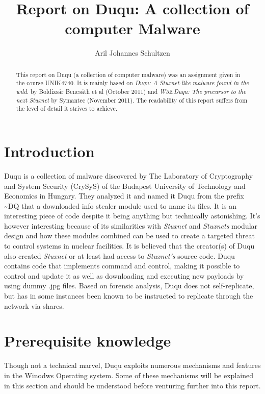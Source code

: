 \documentclass[11pt,english,a4paper]{report}
\title{Report on Duqu: A collection of computer Malware}
\author{Aril Johannes Schultzen}
\begin{document}
\maketitle
\thispagestyle{empty}
\setcounter{page}{0}
\tableofcontents
\thispagestyle{empty}
\setcounter{page}{0}
\thispagestyle{empty}
\setcounter{page}{0}
\clearpage
\setcounter{page}{1}

\begin{abstract}
This report on Duqu (a collection of computer malware) was an assignment given in the course UNIK4740. It is mainly based on \textit{Duqu: A Stuxnet-like malware found in the wild.}\cite{DUQU_BUD} by Boldizsár Bencsáth et al (October 2011) and \textit{W32.Duqu: The precursor to the next Stuxnet}\cite{DUQU_SYMANTEC} by Symantec (November 2011). The readability of this report suffers from the level of detail it strives to achieve.
\end{abstract}
\newpage

\chapter{Introduction}
Duqu is a collection of malware discovered by The Laboratory of Cryptography and System Security (CrySyS) of the Budapest University of Technology and Economics in Hungary. They analyzed it and named it Duqu from the prefix \textasciitilde DQ that a downloaded info stealer module used to name its files. It is an interesting piece of code despite it being anything but technically astonishing. It's however interesting because of its similarities with \textit{Stuxnet} and \textit{Stuxnets} modular design and how these modules combined can be used to create a targeted threat to control systems in nuclear facilities. It is believed that the creator(s) of Duqu also created \textit{Stuxnet} or at least had access to \textit{Stuxnet's} source code. Duqu contains code that implements command and control, making it possible to control and update it as well as downloading and executing new payloads by using dummy .jpg files. Based on forensic analysis, Duqu does not self-replicate, but has in some instances been known to be instructed to replicate through the network via shares. \cite{DUQU_SYMANTEC}

\chapter{Prerequisite knowledge}
Though not a technical marvel, Duqu exploits numerous mechanisms and features in the Winodws Operating system. Some of these mechanisms will be explained in this section and should be understood before venturing further into this report.
\end{document}
